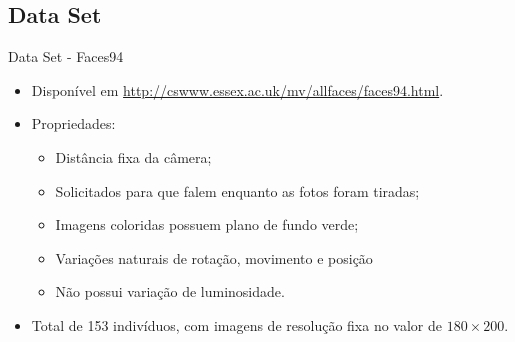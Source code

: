 \documentclass[aspectratio=169, xcolor=dvipsnames]{beamer}
\let\olditem=\item%
\renewcommand{\item}{\olditem \justifying}
\begin{document}
	\subsection{Data Set}
		\begin{frame}{Data Set - Faces94}
			
			\begin{multicols*}{2}
				
				\begin{itemize}
					\item Disponível em \url{http://cswww.essex.ac.uk/mv/allfaces/faces94.html}.
					
					\bigskip
					
					\item Propriedades:
					\begin{itemize}
						\item Distância fixa da câmera;
						\item Solicitados para que falem enquanto as fotos foram tiradas;
						\item Imagens coloridas possuem plano de fundo verde;
						\item Variações naturais de rotação, movimento e posição
						\item Não possui variação de luminosidade.
					\end{itemize}
				
					\bigskip
					
					\item Total de 153 indivíduos, com imagens de resolução fixa no valor de $ 180 \times 200 $.
				\end{itemize}
				
				\begin{figure}[h]
					\centering
					\qquad
					

\end{figure}
\end{multicols*}
\end{frame}
\end{document}
